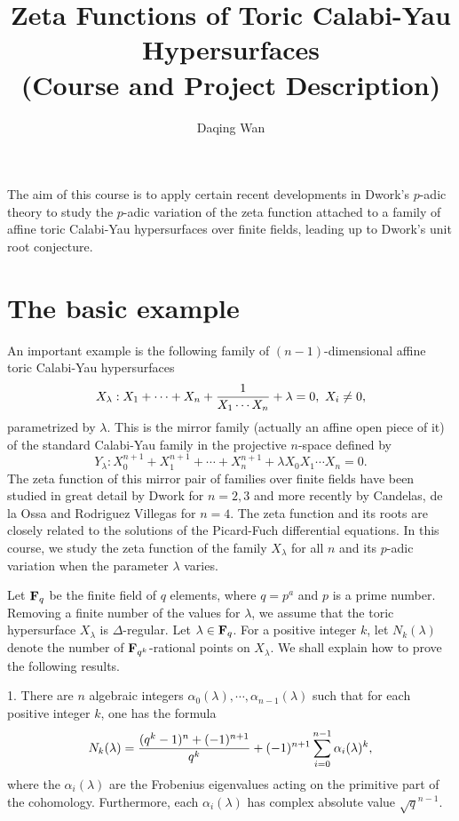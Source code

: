 \documentclass[10XSpt]{article}
\title{{Zeta Functions of Toric Calabi-Yau Hypersurfaces}\\ 
(Course and Project Description)}
\def\F{{\bf F}_q}
\begin{document}
\author{Daqing Wan}


\maketitle

The aim of this course is to apply certain recent developments in 
Dwork's $p$-adic theory to study the $p$-adic variation of the 
zeta function attached to a family of affine toric Calabi-Yau hypersurfaces 
over finite fields, leading up to Dwork's unit root conjecture. 

\section{The basic example}

An important example is the following family of 
$(n-1)$-dimensional affine toric Calabi-Yau hypersurfaces 
$$ X_{\lambda}: X_1 +\cdots +X_n + {1\over X_1\cdots X_n} + \lambda =0, \ X_i \not=0,$$
parametrized by $\lambda$. This is the mirror family (actually an affine open piece 
of it) of the standard Calabi-Yau family in the projective $n$-space defined by 
$$Y_{\lambda}: X_0^{n+1}+X_1^{n+1} +\cdots + X_n^{n+1} + \lambda X_0X_1\cdots X_n=0.$$
The zeta function of this mirror pair of families over finite fields have 
been studied in great detail by Dwork \cite{D1} for $n=2, 3$ and more recently 
by Candelas, de la Ossa and Rodriguez Villegas \cite{COR} for $n=4$. 
The zeta function 
and its roots are closely related to the solutions of the Picard-Fuch 
differential equations. 
In this course, we study the zeta function of the family $X_{\lambda}$ 
for all $n$ and its $p$-adic variation when the parameter $\lambda$ 
varies. 



Let $\F$ be the finite field of $q$ elements, where $q=p^a$ and $p$ is a 
prime number. Removing a finite number of the values for $\lambda$, we 
assume that the toric hypersurface $X_{\lambda}$ is $\Delta$-regular. 
Let $\lambda \in \F$. For a positive integer $k$, let $N_k(\lambda)$ denote the 
number of ${\bf F}_{q^k}$-rational points on $X_{\lambda}$. 
We shall explain how to prove the following results. 

1. There are $n$ algebraic integers $\alpha_0(\lambda), \cdots, 
\alpha_{n-1}(\lambda)$ 
such that for each positive integer $k$, one has the formula 
$$N_k(\lambda) = {{(q^k-1)^n +(-1)^{n+1}}\over q^k} + 
(-1)^{n+1}\sum_{i=0}^{n-1} \alpha_i(\lambda)^k,$$
where the $\alpha_i(\lambda)$ are the Frobenius eigenvalues acting 
on the primitive part of the cohomology. 
Furthermore, each $\alpha_i(\lambda)$ has complex absolute value $\sqrt{q}^{n-1}$. 
\end{document}
